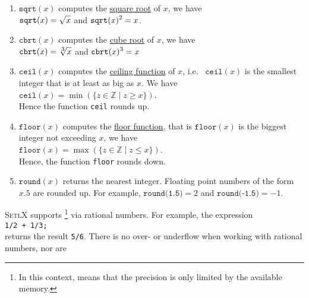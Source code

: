 \begin{enumerate}
\item $\texttt{sqrt}(x)$ computes the \href{https://en.wikipedia.org/wiki/Square_root}{square root} of $x$, we have
      \\[0.2cm]
      \hspace*{1.3cm}
      $\displaystyle\texttt{sqrt}(x) = \sqrt{x}$ \quad and \quad $\displaystyle \texttt{sqrt}(x)^2 = x$.
\item $\texttt{cbrt}(x)$ computes the \href{https://en.wikipedia.org/wiki/Cube_root}{cube root} of $x$, we have
      \\[0.2cm]
      \hspace*{1.3cm}
      $\displaystyle\texttt{cbrt}(x) = \sqrt[\mbox{\scriptsize$3$}]{x}$ \quad and \quad $\displaystyle\texttt{cbrt}(x)^3 = x$
\item $\texttt{ceil}(x)$ computes the \href{https://en.wikipedia.org/wiki/Floor_and_ceiling_functions}{ceiling
      function} of $x$, i.e.~ $\mathtt{ceil}(x)$ is the smallest integer that is at least as big as $x$.  We have
      \\[0.2cm]
      \hspace*{1.3cm}
      $\texttt{ceil}(x) = \min(\{ z \in \mathbb{Z} \mid z \geq x \})$.
      \\[0.2cm]
      Hence the function \texttt{ceil} rounds up.
\item $\texttt{floor}(x)$ computes the \href{https://en.wikipedia.org/wiki/Floor_and_ceiling_functions}{floor function},
      that is $\texttt{floor}(x)$ is the biggest integer not exceeding $x$, we have
      \\[0.2cm]
      \hspace*{1.3cm}
      $\texttt{floor}(x) = \max(\{ z \in \mathbb{Z} \mid z \leq x \})$.
      \\[0.2cm]
      Hence, the function \texttt{floor} rounds down.
\item $\texttt{round}(x)$ returns the nearest integer.  Floating point numbers of the form $x.5$ are rounded up.
      For example, $\texttt{round(1.5)}=2$ and $\texttt{round(-1.5)}=-1$.
\end{enumerate}
\textsc{SetlX} supports \footnote{
  In this context,  means
  that the precision is only limited by the available memory.
}
via rational numbers.  For example, the expression
\\[0.2cm]
\hspace*{1.3cm}
\texttt{1/2 + 1/3;}
\\[0.2cm]
returns the result \texttt{5/6}.  There is no over- or underflow when working with rational numbers, nor are

